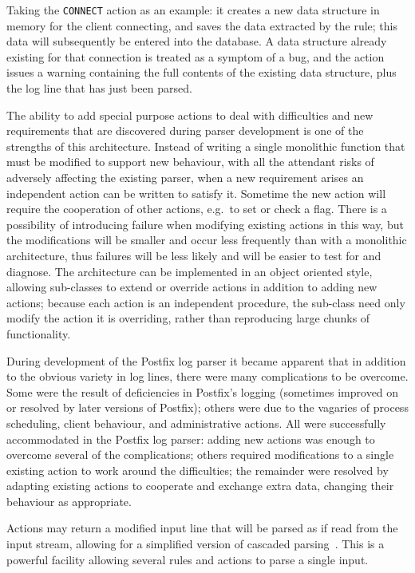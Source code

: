 \documentclass{svmult}
\begin{document}
Taking the \texttt{CONNECT} action as an example: it creates a new data
structure in memory for the client connecting, and saves the data extracted
by the rule; this data will subsequently be entered into the database.  A
data structure already existing for that connection is treated as a symptom
of a bug, and the action issues a warning containing the full contents of
the existing data structure, plus the log line that has just been parsed.

The ability to add special purpose actions to deal with difficulties and
new requirements that are discovered during parser development is one of
the strengths of this architecture.  Instead of writing a single monolithic
function that must be modified to support new behaviour, with all the
attendant risks of adversely affecting the existing parser, when a new
requirement arises an independent action can be written to satisfy it.
Sometime the new action will require the cooperation of other actions,
e.g.\ to set or check a flag.  There is a possibility of introducing
failure when modifying existing actions in this way, but the modifications
will be smaller and occur less frequently than with a monolithic
architecture, thus failures will be less likely and will be easier to test
for and diagnose.  The architecture can be implemented in an object
oriented style, allowing sub-classes to extend or override actions in
addition to adding new actions; because each action is an independent
procedure, the sub-class need only modify the action it is overriding,
rather than reproducing large chunks of functionality.

During development of the Postfix log parser it became apparent that in
addition to the obvious variety in log lines, there were many complications
to be overcome.  Some were the result of deficiencies in Postfix's logging
(sometimes improved on or resolved by later versions of Postfix); others
were due to the vagaries of process scheduling, client behaviour, and
administrative actions.  All were successfully accommodated in the Postfix
log parser: adding new actions was enough to overcome several of the
complications; others required modifications to a single existing action to
work around the difficulties; the remainder were resolved by adapting
existing actions to cooperate and exchange extra data, changing their
behaviour as appropriate.

Actions may return a modified input line that will be parsed as if read
from the input stream, allowing for a simplified version of cascaded
parsing~\cite{cascaded-parsing}.  This is a powerful facility allowing
several rules and actions to parse a single input.
\end{document}
